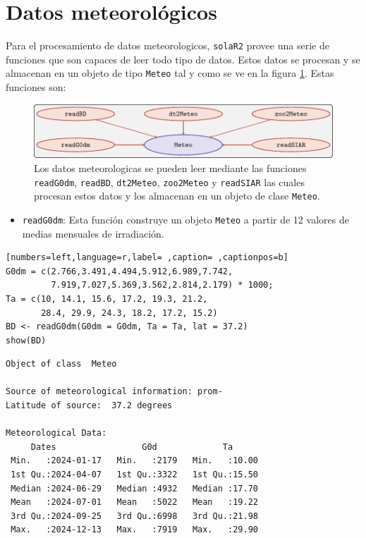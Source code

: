 \section{Datos meteorológicos}
\label{sec:orge5f12fb}
\label{sec:datos-meteorologicos}
Para el procesamiento de datos meteorologicos, \texttt{solaR2} provee una serie de funciones que son capaces de leer todo tipo de datos. Estos datos se procesan y se almacenan en un objeto de tipo \texttt{Meteo} tal y como se ve en la figura \ref{fig:meteo}. Estas funciones son:
\begin{figure}[htbp]
\centering
\includegraphics[keepaspectratio,width=\textwidth,height=0.5\textheight]{figuras/meteo.pdf}
\caption{Los datos meteorologicas se pueden leer mediante las funciones \texttt{readG0dm}, \texttt{readBD}, \texttt{dt2Meteo}, \texttt{zoo2Meteo} y \texttt{readSIAR} las cuales procesan estos datos y los almacenan en un objeto de clase \texttt{Meteo}. \label{fig:meteo}}
\end{figure}
\begin{itemize}
\item \texttt{readG0dm}: Esta función construye un objeto \texttt{Meteo} a partir de 12 valores de medias mensuales de irradiación.
\end{itemize}
\begin{lstlisting}[numbers=left,language=r,label= ,caption= ,captionpos=b]
G0dm = c(2.766,3.491,4.494,5.912,6.989,7.742,
         7.919,7.027,5.369,3.562,2.814,2.179) * 1000;
Ta = c(10, 14.1, 15.6, 17.2, 19.3, 21.2,
       28.4, 29.9, 24.3, 18.2, 17.2, 15.2)
BD <- readG0dm(G0dm = G0dm, Ta = Ta, lat = 37.2)
show(BD)
\end{lstlisting}

\begin{verbatim}
Object of class  Meteo 

Source of meteorological information: prom- 
Latitude of source:  37.2 degrees

Meteorological Data:
     Dates                 G0d             Ta       
 Min.   :2024-01-17   Min.   :2179   Min.   :10.00  
 1st Qu.:2024-04-07   1st Qu.:3322   1st Qu.:15.50  
 Median :2024-06-29   Median :4932   Median :17.70  
 Mean   :2024-07-01   Mean   :5022   Mean   :19.22  
 3rd Qu.:2024-09-25   3rd Qu.:6998   3rd Qu.:21.98  
 Max.   :2024-12-13   Max.   :7919   Max.   :29.90
\end{verbatim}

